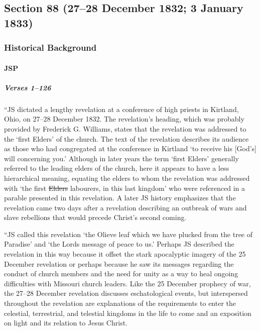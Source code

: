 \subsection{Section 88 (27--28 December 1832; 3 January 1833)}
	\label{DC88}
	
	\subsubsection{Historical Background}
		\label{DC88-HB}
		
		\paragraph{JSP}
		
			\subparagraph{Verses 1--126}
			
				``JS dictated a lengthy revelation at a conference of high priests in Kirtland, Ohio, on 27--28 December 1832. The revelation's heading, which was probably provided by Frederick G. Williams, states that the revelation was addressed to the `first Elders' of the church. The text of the revelation describes its audience as those who had congregated at the conference in Kirtland `to receive his [God's] will concerning you.' Although in later years the term `first Elders' generally referred to the leading elders of the church, here it appears to have a less hierarchical meaning, equating the elders to whom the revelation was addressed with `the first \sout{Elders} labourers, in this last kingdom' who were referenced in a parable presented in this revelation. A later JS history emphasizes that the revelation came two days after a revelation describing an outbreak of wars and slave rebellions that would precede Christ's second coming.

				``JS called this revelation `the Olieve leaf which we have plucked from the tree of Paradise' and `the Lords message of peace to us.' Perhaps JS described the revelation in this way because it offset the stark apocalyptic imagery of the 25 December revelation or perhaps because he saw its messages regarding the conduct of church members and the need for unity as a way to heal ongoing difficulties with Missouri church leaders. Like the 25 December prophecy of war, the 27--28 December revelation discusses eschatological events, but interspersed throughout the revelation are explanations of the requirements to enter the celestial, terrestrial, and telestial kingdoms in the life to come and an exposition on light and its relation to Jesus Christ.

